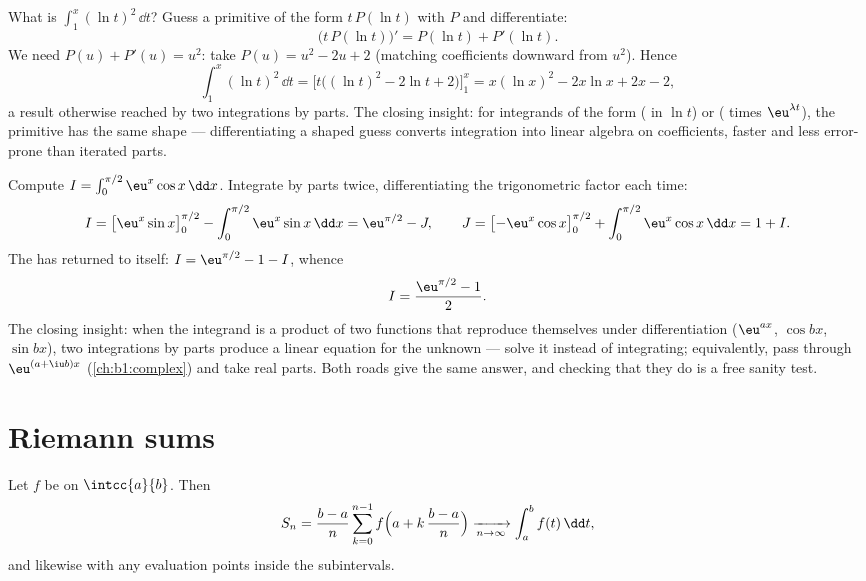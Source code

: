 \begin{example}\label{ex:b1:integration:guessdiff}
What is $\int_1^x (\ln t)^2\,\dd t$? Guess a primitive of the
form $t\,P(\ln t)$ with $P$  and differentiate:
\[
\bigl(t\,P(\ln t)\bigr)' = P(\ln t) + P'(\ln t) .
\]
We need $P(u) + P'(u) = u^2$: take $P(u) = u^2 - 2u + 2$
(matching coefficients downward from $u^2$). Hence
\[
\int_1^x (\ln t)^2\,\dd t
= \bigl[t\bigl((\ln t)^2 - 2\ln t + 2\bigr)\bigr]_1^x
= x(\ln x)^2 - 2x\ln x + 2x - 2 ,
\]
a result otherwise reached by two integrations by parts. The
closing insight: for integrands of the form
( in $\ln t$) or ( times $\eu^{\lambda t}$),
the primitive has the same shape --- differentiating a shaped
guess converts integration into linear algebra on coefficients,
faster and less error-prone than iterated parts.
\end{example}

\begin{example}\label{ex:b1:integration:boomerang}
Compute $I = \int_0^{\pi/2} \eu^x \cos x\,\dd x$. Integrate by
parts twice, differentiating the trigonometric factor each time:
\[
I = \bigl[\eu^x \sin x\bigr]_0^{\pi/2}
- \int_0^{\pi/2} \eu^x \sin x\,\dd x
= \eu^{\pi/2} - J,
\qquad
J = \bigl[-\eu^x\cos x\bigr]_0^{\pi/2}
+ \int_0^{\pi/2} \eu^x\cos x\,\dd x = 1 + I .
\]
The  has returned to itself: $I = \eu^{\pi/2} - 1 - I$,
whence
\[
I = \frac{\eu^{\pi/2} - 1}{2} .
\]
The closing insight: when the integrand is a product of two
functions that reproduce themselves under differentiation
($\eu^{ax}$, $\cos bx$, $\sin bx$), two integrations by parts
produce a linear equation for the unknown  --- solve it
instead of integrating; equivalently, pass through
$\eu^{(a + \iu b)x}$ (\cref{ch:b1:complex}) and take real
parts. Both roads give the same answer, and checking that they
do is a free sanity test.
\end{example}

\section{Riemann sums}

\begin{theorem}\label{thm:b1:integration:riemann}
Let $f$ be  on $\intcc{a}{b}$. Then
\[
S_n = \frac{b - a}{n} \sum_{k=0}^{n-1}
f\Bigl(a + k\,\frac{b-a}{n}\Bigr)
\xrightarrow[n \to \infty]{} \int_a^b f(t)\, \dd t ,
\]
and likewise with any evaluation points inside the subintervals.
\end{theorem}

